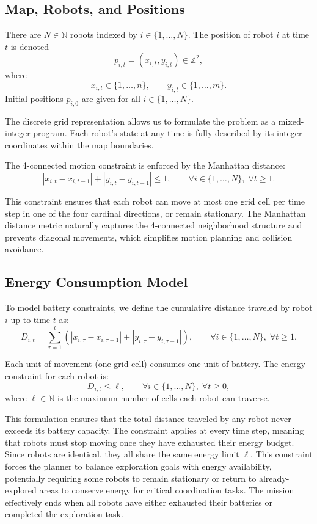 \subsection*{Map, Robots, and Positions}

There are $N \in \mathbb{N}$ robots indexed by $i \in \{1,\ldots,N\}$. The position of robot $i$ at time $t$ is denoted
\[
    p_{i,t} = (x_{i,t}, y_{i,t}) \in \mathbb{Z}^2,
\]
where
\[
    x_{i,t} \in \{1,\ldots,n\}, \qquad y_{i,t} \in \{1,\ldots,m\}.
\]
Initial positions $p_{i,0}$ are given for all $i \in \{1,\ldots,N\}$.

The discrete grid representation allows us to formulate the problem as a mixed-integer program. Each robot's state at any time is fully described by its integer coordinates within the map boundaries.

The 4-connected motion constraint is enforced by the Manhattan distance:
\[
    |x_{i,t}-x_{i,t-1}| + |y_{i,t}-y_{i,t-1}| \le 1, \qquad \forall i \in \{1,\ldots,N\},\; \forall t \ge 1.
\]

This constraint ensures that each robot can move at most one grid cell per time step in one of the four cardinal directions, or remain stationary. The Manhattan distance metric naturally captures the 4-connected neighborhood structure and prevents diagonal movements, which simplifies motion planning and collision avoidance.

\subsection*{Energy Consumption Model}

To model battery constraints, we define the cumulative distance traveled by robot $i$ up to time $t$ as:
\[
    D_{i,t} = \sum_{\tau=1}^{t} \left(|x_{i,\tau}-x_{i,\tau-1}| + |y_{i,\tau}-y_{i,\tau-1}|\right), \qquad \forall i \in \{1,\ldots,N\},\; \forall t \ge 1.
\]

Each unit of movement (one grid cell) consumes one unit of battery. The energy constraint for each robot is:
\[
    D_{i,t} \le \ell, \qquad \forall i \in \{1,\ldots,N\},\; \forall t \ge 0,
\]
where $\ell \in \mathbb{N}$ is the maximum number of cells each robot can traverse.

This formulation ensures that the total distance traveled by any robot never exceeds its battery capacity. The constraint applies at every time step, meaning that robots must stop moving once they have exhausted their energy budget. Since robots are identical, they all share the same energy limit $\ell$. This constraint forces the planner to balance exploration goals with energy availability, potentially requiring some robots to remain stationary or return to already-explored areas to conserve energy for critical coordination tasks. The mission effectively ends when all robots have either exhausted their batteries or completed the exploration task.

